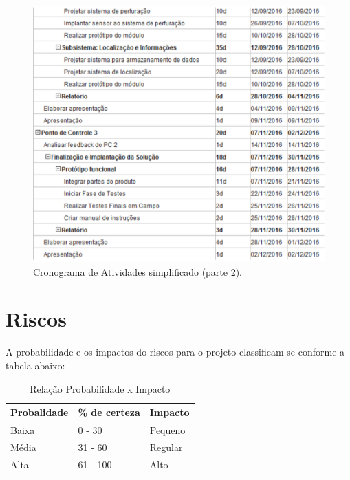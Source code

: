       \begin{figure}[!htbp]
      \begin{center}
      \includegraphics[width=\textwidth]{figuras/cronograma_simples_2.eps}
      \caption{\label{fig:cron_s2}Cronograma de Atividades simplificado (parte 2).}
      \end{center}
      \end{figure}

  \section{Riscos}

    A probabilidade e os impactos do riscos para o projeto classificam-se conforme a tabela abaixo:

  \begin{table}[!htbp]
    \begin{center}
    \caption{\label{probabilidadeximpacto}Relação Probabilidade x Impacto}
    \begin{tabular}{|l|l|l|}
    \hline
    \textbf{Probalidade} & \textbf{\% de certeza} & \textbf{Impacto} \\ \hline\hline
    Baixa                & 0 - 30                 & Pequeno          \\ \hline
    Média                & 31 - 60                & Regular          \\ \hline
    Alta                 & 61 - 100               & Alto             \\ \hline
    \end{tabular}
    \end{center}
  \end{table}

